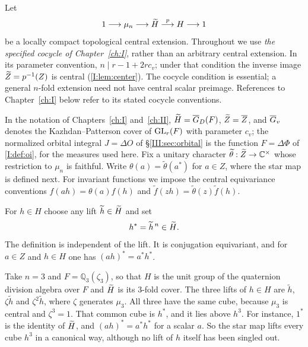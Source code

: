 Let
\begin{equation}\label{III:eq:extension}
1\longrightarrow\mu_n\longrightarrow\widetilde H\overset{p}{\longrightarrow}H\longrightarrow1
\end{equation}
be a locally compact topological central extension. Throughout we use \emph{the specified cocycle of Chapter~\ref{ch:I}}, rather than an arbitrary central extension. In its parameter convention, $n\mid r-1+2rc_v$; under that condition the inverse image $\widetilde Z=p^{-1}(Z)$ is central (\cref{I:lem:center}). The cocycle condition is essential; a general $n$-fold extension need not have central scalar preimage. References to Chapter~\ref{ch:I} below refer to its stated cocycle conventions.

In the notation of Chapters~\ref{ch:I} and~\ref{ch:II}, $\widetilde H=\overline{G}_D(F)$, $\widetilde Z=\overline{Z}$, and $\overline{G}_v$ denotes the Kazhdan--Patterson cover of $\operatorname{GL}_r(F)$ with parameter $c_v$; the normalized orbital integral $J=\Delta O$ of \S\ref{III:sec:orbital} is the function $F=\Delta\Phi$ of \cref{I:def:oi}, for the measures used here. Fix a unitary character $\widetilde\theta:\widetilde Z\to\mathbb C^\times$ whose restriction to $\mu_n$ is faithful. Write $\theta(a)=\widetilde\theta(a^*)$ for $a\in Z$, where the star map is defined next. For invariant functions we impose the central equivariance conventions $f(ah)=\theta(a)f(h)$ and $\widetilde f(zh)=\widetilde\theta(z)\widetilde f(h)$.

\begin{definition}\label{III:def:star}
For $h\in H$ choose any lift $\widetilde h\in\widetilde H$ and set
\begin{equation}\label{III:eq:star}
h^*=\widetilde h^{\,n}\in\widetilde H.
\end{equation}
The definition is independent of the lift. It is conjugation equivariant, and for $a\in Z$ and $h\in H$ one has $(ah)^*=a^*h^*$.
\end{definition}

\begin{example}\label{III:ex:star}
Take $n=3$ and $F=\mathbb Q_3(\zeta_3)$, so that $H$ is the unit group of the quaternion division algebra over $F$ and $\widetilde H$ is its $3$-fold cover. The three lifts of $h\in H$ are $\widetilde h$, $\zeta\widetilde h$ and $\zeta^2\widetilde h$, where $\zeta$ generates $\mu_3$. All three have the same cube, because $\mu_3$ is central and $\zeta^3=1$. That common cube is $h^*$, and it lies above $h^3$. For instance, $1^*$ is the identity of $\widetilde H$, and $(ah)^*=a^*h^*$ for a scalar $a$. So the star map lifts every cube $h^3$ in a canonical way, although no lift of $h$ itself has been singled out.
\end{example}

